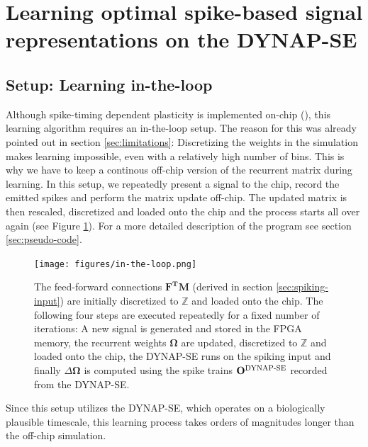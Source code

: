\documentclass[twoside,11pt]{article}
\begin{document}
\section{Learning optimal spike-based signal representations on the DYNAP-SE}
\subsection{Setup: Learning in-the-loop}
Although spike-timing dependent plasticity is implemented on-chip (\cite{DBLP:journals/corr/abs-1708-04198}), this learning
algorithm requires an in-the-loop setup. The reason for this was already pointed out in
section \ref{sec:limitations}: Discretizing the weights in the simulation
makes learning impossible, even with a relatively high number of bins. This is why
we have to keep a continous off-chip version of the recurrent matrix during learning.
In this setup, we repeatedly present a signal to
the chip, record the emitted spikes and perform the matrix update off-chip. The updated
matrix is then rescaled, discretized and loaded onto the chip and the process starts
all over again (see Figure \ref{fig:in-the-loop}). For a more detailed description of the
program see section \ref{sec:pseudo-code}.

\begin{center}
  \begin{figure}[!htb]
    \texttt{[image: figures/in-the-loop.png]}
    \caption{The feed-forward connections $\mathbf{F^TM}$ (derived in section \ref{sec:spiking-input}) are initially discretized to $\mathbb{Z}$
    and loaded onto the chip. The following four steps are executed repeatedly
    for a fixed number of iterations: A new signal is generated and stored in the
    FPGA memory, the recurrent weights $\mathbf{\Omega}$ are updated, discretized
    to $\mathbb{Z}$ and loaded onto the chip, the DYNAP-SE runs on the spiking input
     and finally $\Delta \mathbf{\Omega}$ is computed using the spike trains
    $\mathbf{O}^{\textnormal{DYNAP-SE}}$ recorded from the DYNAP-SE.}
    \label{fig:in-the-loop}
  \end{figure}
\end{center}

Since this setup utilizes the DYNAP-SE, which operates on a biologically plausible timescale,
this learning process takes orders of magnitudes longer than the off-chip simulation.

\newpage
\end{document}
